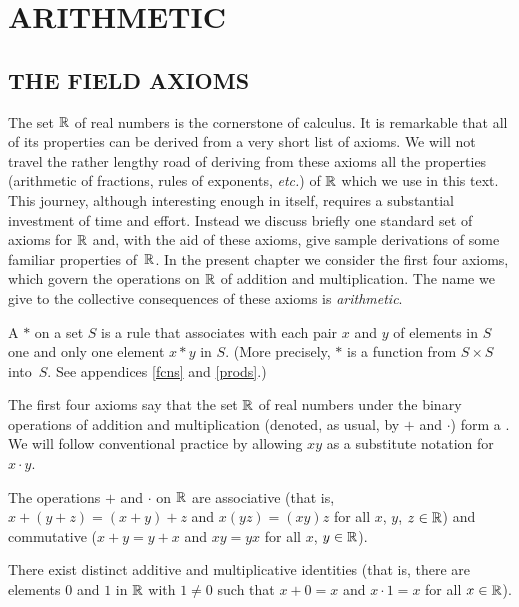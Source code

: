 \chapter{ARITHMETIC}\label{arithmetic}
\section{THE FIELD AXIOMS}
The set $\mathbb{R}$ of real numbers is the cornerstone of calculus.  It is remarkable that all of its
properties can be derived from a very short list of axioms.  We will not travel the rather
lengthy road of deriving from these axioms all the properties  (arithmetic of fractions, rules
of exponents, \emph{etc.}) of $\mathbb{R}$ which we use in this text.  This journey, although
interesting enough in itself, requires a substantial investment of time and effort.  Instead
we discuss briefly one standard set of axioms for $\mathbb{R}$ and, with the aid of these axioms, give
sample derivations of some familiar properties of~$\mathbb{R}$. In the present chapter we consider the
first four axioms, which govern the operations on $\mathbb{R}$ of addition and multiplication.  The
name we give to the collective consequences of these axioms is
%
\emph{arithmetic}.

\begin{defn} A
 $\ast$ on a set $S$ is a rule that associates with each pair $x$ and $y$
of elements in $S$ one and only one element $x \ast y$ in $S$.  (More precisely, $\ast$ is a
function from $S \times S$ into~$S$. See appendices \ref{fcns} and \ref{prods}.)
\end{defn}

The first four axioms say that the set $\mathbb{R}$ of real numbers under the binary operations of
addition and multiplication (denoted, as usual, by $+$ and $\cdot$) form a
.  We will follow conventional practice by allowing $xy$ as a substitute notation
for $x \cdot y$.

\begin{ax}[I] The operations $+$ and $\cdot$ on $\mathbb{R}$ are
associative (that is, $x + (y + z)  =  (x + y) + z$ and $x(y z) = (xy)z$ for all $x$, $y$, $z
\in \mathbb{R}$) and
commutative ($x + y = y + x$ and $xy = yx$ for all $x$, $y \in \mathbb{R}$).
\end{ax}

\begin{ax}[II]  There exist distinct additive and multiplicative
identities (that is, there are elements $0$ and $1$ in $\mathbb{R}$ with $1 \ne 0$ such that $x + 0 =
x$ and $x \cdot 1 = x$ for all $x \in \mathbb{R}$).
\end{ax}

